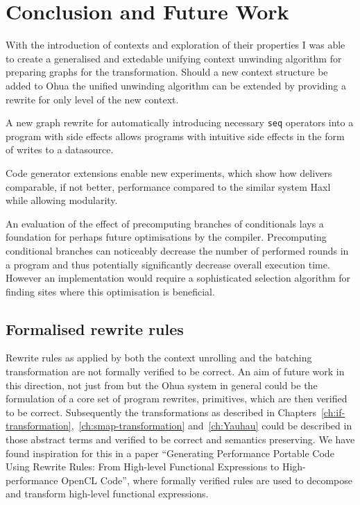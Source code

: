 \chapter{Conclusion and Future Work}

\label{ch:future-work}

With the introduction of contexts and exploration of their properties I was able to create a generalised and extedable unifying context unwinding algorithm for preparing graphs for the \yauhau{} transformation.
Should a new context structure be added to Ohua the unified unwinding algorithm can be extended by providing a rewrite for only level of the new context.

A new graph rewrite for automatically introducing necessary \texttt{seq} operators into a program with side effects allows \yauhau{} programs with intuitive side effects in the form of writes to a datasource.

Code generator extensions enable new experiments, which show how \yauhau{} delivers comparable, if not better, performance compared to the similar system Haxl while allowing modularity.

An evaluation of the effect of precomputing branches of conditionals lays a foundation for perhaps future optimisations by the compiler.
Precomputing conditional branches can noticeably decrease the number of performed rounds in a program and thus potentially significantly decrease overall execution time.
However an implementation would require a sophisticated selection algorithm for finding sites where this optimisation is beneficial.


\section{Formalised rewrite rules}

Rewrite rules as applied by both the context unrolling and the batching transformation are not formally verified to be correct.
An aim of future work in this direction, not just from \yauhau{} but the Ohua system in general could be the formulation of a core set of program rewrites, primitives, which are then verified to be correct.
Subsequently the transformations as described in Chapters~\ref{ch:if-transformation},~\ref{ch:smap-transformation} and~\ref{ch:Yauhau} could be described in those abstract terms and verified to be correct and semantics preserving.
We have found inspiration for this in a paper ``Generating Performance Portable Code Using Rewrite Rules: From High-level Functional Expressions to High-performance OpenCL Code''\cite{Steuwer:2015:GPP:2858949.2784754}, where formally verified rules are used to decompose and transform high-level functional expressions.

